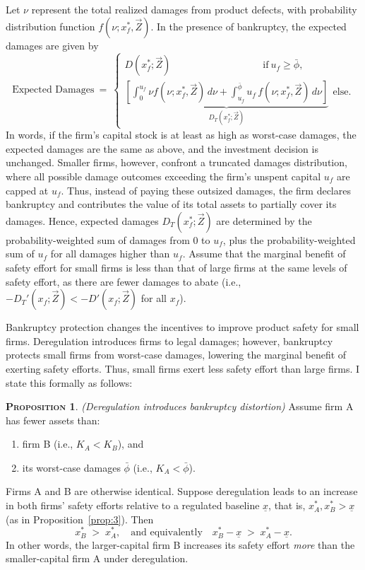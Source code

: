 \documentclass[letterpaper,12pt]{article}
\theoremstyle{definition}
\newtheorem{proposition}{\normalfont\scshape Proposition} %
\begin{document}
Let $\nu$ represent the total realized damages from product defects, with probability distribution function $f(\nu; x^*_f,\vec{Z})$. In the presence of bankruptcy, the expected damages are given by 
\begin{equation}\label{eq:firmprofitwbankruptcy}
\text{Expected Damages} ~=~ 
\begin{cases}
D(x_f^*;\vec{Z}) ~~~~~~~~~~~~~~~~~~~~~~~~~~~~~~~~~~~~~~~~~~\text{if}~ u_f\geq \bar{\phi},\\
\underbrace{\left[\int_0^{u_f}\nu f(\nu; x_f^*,\vec{Z})\,d\nu + \int_{u_f}^{\bar{\phi}}u_f\, f(\nu; x_f^*,\vec{Z})\,d\nu \right]}_{D_T(x_f^*;\vec{Z})}  ~~ \text{else}.
\end{cases}
\end{equation}
In words, if the firm's capital stock is at least as high as worst-case damages, the expected damages are the same as above, and the investment decision is unchanged. Smaller firms, however, confront a truncated damages distribution, where all possible damage outcomes exceeding the firm's unspent capital $u_f$ are capped at $u_f$. Thus, instead of paying these outsized damages, the firm declares bankruptcy and contributes the value of its total assets to partially cover its damages. Hence, expected damages $D_T(x_f^*;\vec{Z})$ are determined by the probability-weighted sum of damages from 0 to $u_f$, plus the probability-weighted sum of $u_f$ for all damages higher than $u_f$. Assume that the marginal benefit of safety effort for small firms is less than that of large firms at the same levels of safety effort, as there are fewer damages to abate (i.e., $-D_T'(x_f;\vec{Z}) < -D'(x_f;\vec{Z})$ for all $x_f$).

Bankruptcy protection changes the incentives to improve product safety for small firms. Deregulation introduces firms to legal damages; however, bankruptcy protects small firms from worst-case damages, lowering the marginal benefit of exerting safety efforts. Thus, small firms exert less safety effort than large firms. I state this formally as follows:
\begin{proposition}\label{prop:bankruptcydistortion}
\textit{(Deregulation introduces bankruptcy distortion)} 
Assume firm A has fewer assets than: 
\begin{enumerate}
    \item[(i)] firm B (i.e., \(K_A < K_B\)), and 
    \item[(ii)] its worst-case damages \(\bar{\phi}\) (i.e., \(K_A < \bar{\phi}\)). 
\end{enumerate}
Firms A and B are otherwise identical. Suppose deregulation leads to an increase in both firms' safety efforts relative to a regulated baseline \(\underline{x}\), that is, \(x_A^*, x_B^* > \underline{x}\) (as in Proposition~\ref{prop:3}). Then
\[
    x_B^* \;>\; x_A^*,
    \quad\text{and equivalently}\quad
    x_B^* - \underline{x} \;>\; x_A^* - \underline{x}.
\]
In other words, the larger-capital firm B increases its safety effort \emph{more} than the smaller-capital firm A under deregulation.
\end{proposition}
\end{document}
